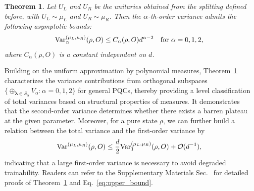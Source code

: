 \documentclass[%
 superscriptaddress,
 aps,prl,
 reprint,
 twocolumn,
 amsmath,amssymb,showpacs,
 bibnotes,
]{revtex4-2}
\newtheorem{theorem}{Theorem}
\newcommand{\RomanNumeralCaps}[1]
    {\MakeUppercase{\romannumeral #1}}
\begin{document}
\begin{theorem}
    Let $U_L$ and $U_R$ be the unitaries obtained from the splitting defined before, with $U_L\sim \mu_L$ and $U_R\sim \mu_R$. Then the $\alpha$-th-order variance admits the following asymptotic bounds:
    \begin{equation}
        {\rm Var}^{(\mu_L,\mu_R)}_\alpha(\rho, O) \leq C_\alpha(\rho, O)d^{\alpha-2}\quad {\rm for}\ \alpha=0,1,2,
    \end{equation}
    where $C_\alpha(\rho, O)$ is a constant independent on $d$.
    \label{thm:1}
\end{theorem}
Building on the uniform approximation by polynomial measures, Theorem~\ref{thm:1} characterizes the variance contributions from orthogonal subspaces $\{\oplus_{\boldsymbol{\lambda}\in S_\alpha} V_\alpha:\alpha = 0, 1,2 \}$ for general PQCs, thereby providing a level classification of total variances based on structural properties of measures. It demonstrates that the second-order variance determines whether there exists a barren plateau at the given parameter. Moreover, for a pure state $\rho$, we can further build a relation between the total variance and the first-order variance by
    \begin{equation}
        {\rm Var}^{(\mu_L,\mu_R)}(\rho, O) \leq \frac{d}{2}{\rm Var}^{(\mu_L,\mu_R)}_1(\rho, O) + \mathcal{O}(d^{-1}),
        \label{eq:upper_bound}
    \end{equation}
indicating that a large first-order variance is necessary to avoid degraded trainability. Readers can refer to the Supplementary Materials Sec.~\RomanNumeralCaps{4} for detailed proofs of Theorem~\ref{thm:1} and Eq.~\eqref{eq:upper_bound}.
\end{document}
